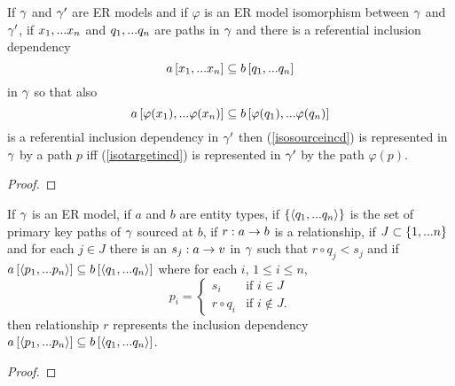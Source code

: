 \begin{lemma}
If $\gamma$ and $\gamma'$ are ER models and  if  $\varphi$ is an ER model isomorphism between $\gamma$  and $\gamma'$,  
if $x_1,...x_n$ and $q_1,...q_n$ are paths in 
$\gamma$
and there is a referential  inclusion dependency
\begin{equation}
\label{isosourceincd}
a\left[x_1,...x_n\right]\subseteq b\left[q_1,...q_n\right]
\end{equation}
 in $\gamma$ 
so that also 
\begin{equation}
\label{isotargetincd}
a\left[\varphi(x_1),...\varphi(x_n)\right]\subseteq b\left[\varphi(q_1),...\varphi(q_n)\right]
\end{equation}
is a referential inclusion dependency in $\gamma'$
then (\ref{isosourceincd}) is represented in $\gamma$ by a path $p$
iff (\ref{isotargetincd}) is represented in $\gamma'$ by the path $\varphi(p)$.
\end{lemma}
\begin{proof}
\tbd
\end{proof}

\begin{lemma}
If $\gamma$ is an ER model, if $a$ and $b$ are entity types, if $\left\{\langle q_1,...q_n\rangle\right\}$ is the set
of primary key paths of $\gamma$ sourced at $b$, if $r:a \rightarrow b$ is a relationship, 
if $J \subset \left\{1,...n\right\}$ and for each $j \in J$ there is an $s_j:a \rightarrow v$ in $\gamma$ such that $r \circ q_j < s_j$  and if $a\left[\langle p_1,...p_n\rangle\right]\subseteq b\left[\langle q_1,...q_n\rangle\right]$
where for each $i$, $1 \leq i \leq n$, 
$$
p_i =
\begin{cases} 
    s_i         & \mbox{if $i \in J$} \\
    r \circ q_i & \mbox{if $i \notin J$.}
\end{cases} 
$$
then relationship $r$ represents the inclusion dependency  $a\left[\langle p_1,...p_n\rangle\right]\subseteq b\left[\langle q_1,...q_n\rangle\right]$.
\end{lemma}
\begin{proof}
\tbd
\end{proof}

